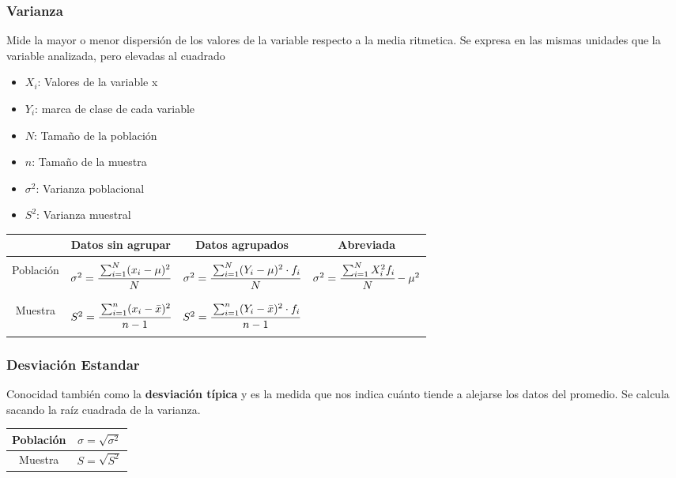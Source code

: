 \documentclass{article}
\begin{document}
        \subsubsection{Varianza }
            Mide la mayor o menor dispersión de los valores de la variable respecto a la media ritmetica. Se expresa en las mismas unidades que la variable analizada, pero elevadas al cuadrado
            \begin{multicols}{2}
                \begin{itemize}
                    \item $X_i$: Valores de la variable x
                    \item $Y_i$: marca de clase de cada variable
                    \item $N$: Tamaño de la población
                    \item $n$: Tamaño de la muestra
                    \item $\sigma^2$: Varianza poblacional
                    \item $S^2$: Varianza muestral
                \end{itemize}
            \end{multicols}
            \begin{table}[H]
                \centering
                \begin{tabular}{|c|c|c|c|}
                    \hline
                    & Datos sin agrupar & Datos agrupados & Abreviada \\ \hline &&&\\
                    Población & $\sigma^2 = \cfrac{\sum_{i=1}^{N}(x_i - \mu)^2}{N}$ &$\sigma^2 = \cfrac{\sum_{i=1}^{N}(Y_i - \mu)^2\cdot f_i}{N}$ & $\sigma^2= \cfrac{\sum_{i=1}^{N}X_i^2f_i}{N} - \mu^2$ \\ &&&\\ \hline &&&\\
                    Muestra & $S^2 = \cfrac{\sum_{i=1}^{n}(x_i - \bar{x})^2}{n-1}$ & $S^2 = \cfrac{\sum_{i=1}^{n}(Y_i - \bar{x})^2\cdot f_i}{n-1}$ & \\ &&&\\\hline
                \end{tabular}
            \end{table}
        \subsubsection{Desviación Estandar}
            Conocidad también como la \textbf{desviación típica} y es la medida que nos indica cuánto tiende a alejarse los datos del promedio. Se calcula sacando la raíz cuadrada de la varianza.
            \begin{table}[H]
                \centering
                \begin{tabular}{|c|c|}
                    \hline
                    Población & $\sigma = \sqrt{\sigma^2}$ \\ \hline
                    Muestra & $S = \sqrt{S^2}$ \\ \hline
                \end{tabular}
            \end{table}
\end{document}
